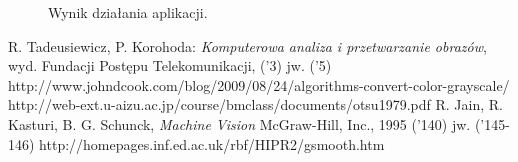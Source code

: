 \documentclass[eng,oneside]{mgr}
\begin{document}
\begin{figure}
\centering
{}
\quad
{}
\caption{Wynik działania aplikacji.}
\end{figure}

\begin{thebibliography}{99}
 R. Tadeusiewicz, P. Korohoda: \emph{Komputerowa analiza i przetwarzanie obrazów}, wyd. Fundacji Postępu Telekomunikacji, ('3)
 jw. ('5)
 http://www.johndcook.com/blog/2009/08/24/algorithms-convert-color-grayscale/
 http://web-ext.u-aizu.ac.jp/course/bmclass/documents/otsu1979.pdf
 R. Jain, R. Kasturi, B. G. Schunck, \emph{Machine Vision} McGraw-Hill, Inc., 1995 ('140)
 jw. ('145-146)
 http://homepages.inf.ed.ac.uk/rbf/HIPR2/gsmooth.htm
\end{thebibliography}
\end{document}
